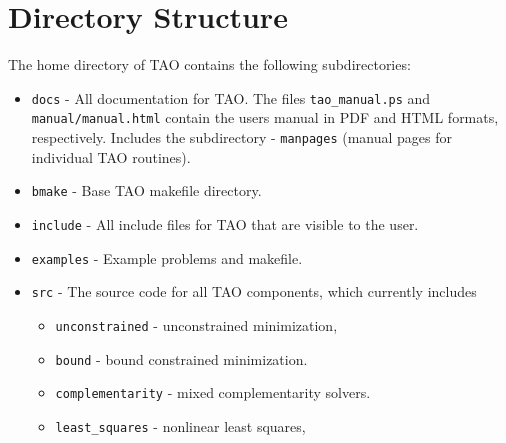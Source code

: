 \section{Directory Structure}

The home directory of TAO contains the following subdirectories:

\begin{itemize}
\item \texttt{docs} - All documentation for TAO. The files \texttt{tao\_manual.ps}
                   and \texttt{manual/manual.html} contain the users manual in
                   PDF and HTML formats, respectively. Includes
                   the subdirectory
 \subitem - \texttt{manpages} (manual pages for individual TAO routines).
\item \texttt{bmake} - Base TAO makefile directory.  
\item \texttt{include} - All include files for TAO that are visible to the user.
\item \texttt{examples} - Example problems and makefile.
\item \texttt{src} - The source code for all TAO components, which
                  currently includes
 \begin{itemize}
 \item \texttt{unconstrained} - unconstrained minimization,
 \item \texttt{bound} - bound constrained minimization.
 \item \texttt{complementarity} - mixed complementarity solvers.
 \item \texttt{least\_squares} - nonlinear least squares,
 \end{itemize}
\end{itemize}

